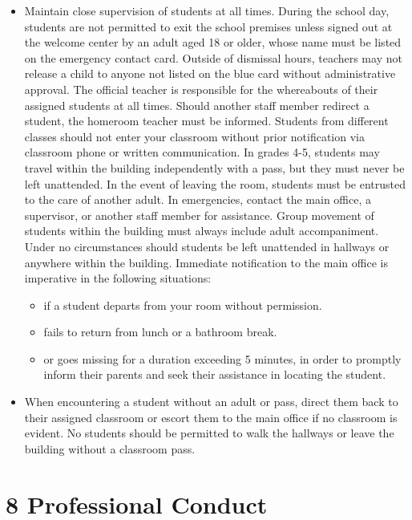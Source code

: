\documentclass[11pt]{article}
\begin{document}
\begin{itemize}
\item Maintain close supervision of students at all times. During the school day, students are not permitted to exit the school premises unless signed out at the welcome center by an adult aged 18 or older, whose name must be listed on the emergency contact card. Outside of dismissal hours, teachers may not release a child to anyone not listed on the blue card without administrative approval. The official teacher is responsible for the whereabouts of their assigned students at all times. Should another staff member redirect a student, the homeroom teacher must be informed. Students from different classes should not enter your classroom without prior notification via classroom phone or written communication. In grades 4-5, students may travel within the building independently with a pass, but they must never be left unattended. In the event of leaving the room, students must be entrusted to the care of another adult. In emergencies, contact the main office, a supervisor, or another staff member for assistance. Group movement of students within the building must always include adult accompaniment. Under no circumstances should students be left unattended in hallways or anywhere within the building. Immediate notification to the main office is imperative in the following situations:

\begin{itemize}
\item if a student departs from your room without permission.

\item fails to return from lunch or a bathroom break.

\item or goes missing for a duration exceeding 5 minutes, in order to promptly inform their parents and seek their assistance in locating the student.
\end{itemize}

\item When encountering a student without an adult or pass, direct them back to their assigned classroom or escort them to the main office if no classroom is evident. No students should be permitted to walk the hallways or leave the building without a classroom pass.
\end{itemize}

\section{8 Professional Conduct}
\label{sec:org4e6bd3d}
\end{document}
